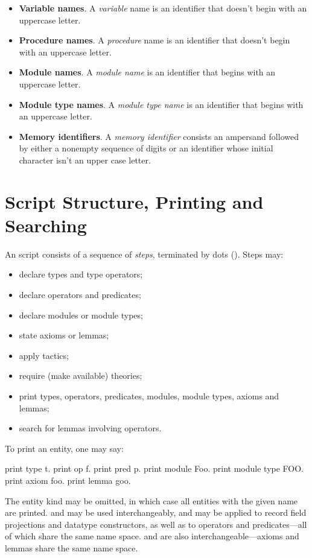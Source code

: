 \begin{itemize}
\item \textbf{Variable names}. A \emph{variable} name is an identifier
  that doesn't begin with an uppercase letter.

\item \textbf{Procedure names}. A \emph{procedure} name is an identifier
  that doesn't begin with an uppercase letter.

\item \textbf{Module names}. A \emph{module name} is an identifier that
  begins with an uppercase letter.

\item \textbf{Module type names}. A \emph{module type name} is an
  identifier that begins with an uppercase letter.

\item \textbf{Memory identifiers}. A \emph{memory identifier} consists
  an ampersand followed by either a nonempty sequence of digits or an
  identifier whose initial character isn't an upper case letter.
\end{itemize}

\section{Script Structure, Printing and Searching}

An \EasyCrypt script consists of a sequence of \emph{steps},
terminated by dots (). Steps may:
\begin{itemize}
\item declare types and type operators;

\item declare operators and predicates;

\item declare modules or module types;

\item state axioms or lemmas;

\item apply tactics;

\item require (make available) theories;

\item print types, operators, predicates, modules, module types,
  axioms and lemmas;

\item search for lemmas involving operators.
\end{itemize}

To print an entity, one may say:
\begin{easycrypt}{}{}
print type t.
print op f.
print pred p.
print module Foo.
print module type FOO.
print axiom foo.
print lemma goo.
\end{easycrypt}
The entity kind may be omitted, in which case all entities with the
given name are printed.  and  may be used
interchangeably, and may be applied to record field projections and
datatype constructors, as well as to operators and predicates---all of which
share the same name space.
 and  are also interchangeable---axioms
and lemmas share the same name space.

